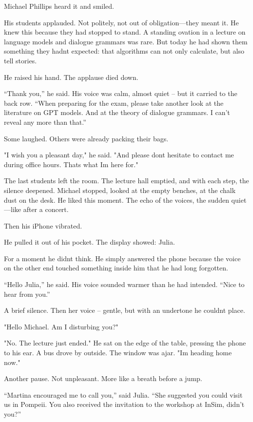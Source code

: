 \documentclass[
]{article}
\begin{document}
Michael Phillips heard it and smiled.

His students applauded. Not politely, not out of obligation---they meant it. He knew this because they had stopped to stand. A standing ovation in a lecture on language models and dialogue grammars was rare. But today he had shown them something they hadn\textquotesingle t expected: that algorithms can not only calculate, but also tell stories.

He raised his hand. The applause died down.

``Thank you,'' he said. His voice was calm, almost quiet -- but it carried to the back row. ``When preparing for the exam, please take another look at the literature on GPT models. And at the theory of dialogue grammars. I can't reveal any more than that.''

Some laughed. Others were already packing their bags.

"I wish you a pleasant day," he said. "And please don\textquotesingle t hesitate to contact me during office hours. That\textquotesingle s what I\textquotesingle m here for."

The last students left the room. The lecture hall emptied, and with each step, the silence deepened. Michael stopped, looked at the empty benches, at the chalk dust on the desk. He liked this moment. The echo of the voices, the sudden quiet---like after a concert.

Then his iPhone vibrated.

He pulled it out of his pocket. The display showed: Julia.

For a moment he didn\textquotesingle t think. He simply answered the phone because the voice on the other end touched something inside him that he had long forgotten.

``Hello Julia,'' he said. His voice sounded warmer than he had intended. ``Nice to hear from you.''

A brief silence. Then her voice -- gentle, but with an undertone he couldn\textquotesingle t place.

"Hello Michael. Am I disturbing you?"

"No. The lecture just ended." He sat on the edge of the table, pressing the phone to his ear. A bus drove by outside. The window was ajar. "I\textquotesingle m heading home now."

Another pause. Not unpleasant. More like a breath before a jump.

``Martina encouraged me to call you,'' said Julia. ``She suggested you could visit us in Pompeii. You also received the invitation to the workshop at InSim, didn't you?''
\end{document}
